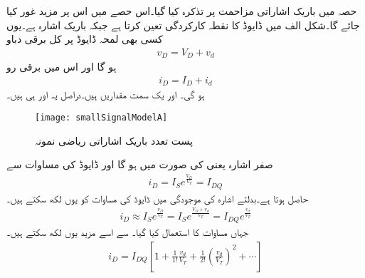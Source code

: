 حصہ   میں باریک اشاراتی مزاحمت  پر تذکرہ کیا گیا۔اس حصے میں اس پر مزید غور کیا جائے گا۔شکل  الف میں   ڈایوڈ کا نقطہ کارکردگی تعین کرتا ہے جبکہ  باریک اشارہ ہے۔یوں کسی بھی لمحہ ڈایوڈ پر کل برقی دباو
\begin{align}
v_D=V_D+v_d
\end{align}
ہو گا اور اس میں برقی رو
\begin{align}
i_D=I_D+i_d
\end{align}
ہو گی۔  اور  یک سمت مقداریں ہیں۔دراصل یہ  اور  ہی ہیں۔
\begin{figure}
\centering
\texttt{[image: smallSignalModelA]}
\caption{پست تعدد باریک اشاراتی ریاضی نمونہ}
\label{شکل_باریک_اشاراتی_ماڈل}
\end{figure}
صفر اشارہ یعنی  کی صورت میں  ہو گا اور ڈایوڈ کی مساوات سے
\begin{align} \label{مساوات_ڈایوڈ_صفر_اشارہ_پر_رو}
i_D=I_S e^{\frac{V_D}{V_T}}=I_{DQ}
\end{align}
حاصل ہوتا ہے۔بدلتے اشارہ کی موجودگی میں ڈایوڈ کی مساوات کو یوں لکھ سکتے ہیں۔
\begin{align}
i_D \approx I_S e^{\frac{v_D}{V_T}} = I_S e^{\frac{V_D+v_d}{V_T}}=I_{DQ} e^{\frac{v_d}{V_T}}
\end{align}
جہاں مساوات   کا استعمال کیا گیا۔  سے اسے مزید  یوں لکھ سکتے ہیں۔
\begin{align}
i_D=I_{DQ} \left[1+ \frac{1}{1!} \frac{v_d}{V_T}+ \frac{1}{2!} \left (\frac{v_d}{V_T} \right )^{2} +\cdots \right ]
\end{align}

